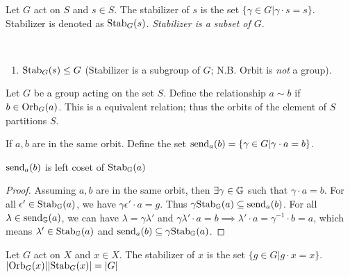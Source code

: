 \documentclass[../note.tex]{subfiles}
\begin{document}
\begin{definition}[Stabilizer]\label{def:stabilizer} 
	Let $G$ act on $S$ and $s \in S$. The stabilizer of $s$ is the set $\{\gamma \in G | \gamma\cdot s = s\}$. Stabilizer is denoted as $\text{Stab}_{G}({s})$.
	\emph{Stabilizer is a subset of $G$}. 
\end{definition}

\begin{theorem}
	\ 
	\begin{enumerate}
		\item $\text{Stab}_{G}({s}) \leq G$ (Stabilizer is a subgroup of $G$; N.B. Orbit is \emph{not} a group).
	\end{enumerate}
\end{theorem}

\begin{theorem}
	Let $G$ be a group acting on the set $S$.
	Define the relationship $a\sim b$ if $b\in \text{Orb}_{G}({a})$.
	This is a equivalent relation; thus the orbits of the element of $S$ partitions $S$.
\end{theorem}

\begin{definition}[Send x]
	If $a,b$ are in the same orbit. Define the set $\text{send}_{a}({b})=\{\gamma\in G| \gamma \cdot a=b \}$.
\end{definition}

\begin{lemma}
$\text{send}_{a}({b})$ is left coset of $\text{Stab}_{\mathbb{G}}({a})$
\end{lemma}

\begin{proof}
	Assuming $a,b$ are in the same orbit, then $\exists \gamma \in \mathbb{G}$ such that $\gamma \cdot a = b$. 
	For all $\epsilon' \in \text{Stab}_{\mathbb{G}}({a})$, we have $\gamma \epsilon' \cdot a = g $. Thus $\gamma\text{Stab}_{\mathbb{G}}({a}) \subseteq \text{send}_{a}({b})$.
	For all $\lambda \in \text{send}_{\mathbb{G}}({a})$, we can have  $\lambda = \gamma\lambda'$ and $\gamma\lambda' \cdot a = b \implies \lambda' \cdot a = \gamma^{-1} \cdot b=a$, which means $\lambda' \in \text{Stab}_{\mathbb{G}}({a})$ and $\text{send}_{a}({b}) \subseteq \gamma\text{Stab}_{\mathbb{G}}({a})$.
\end{proof}

\begin{theorem}
	Let $G$ act on $X$ and $x \in X$. The stabilizer of $x$ is the set $\{g \in G | g\cdot x = x\}$.
	$|\text{Orb}_{G}({x})||\text{Stab}_{G}({x})|=|G|$
\end{theorem}
\end{document}
